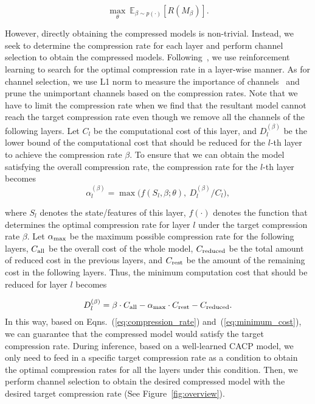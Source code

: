 \documentclass[letterpaper]{article} %
\begin{document}
\begin{equation}
    \max_{\theta} ~\mathbb{E}_{\beta \sim p(\cdot)} \left[  R \left(M_\beta \right) \right].
\end{equation}

However, directly obtaining the compressed models is non-trivial. Instead, we seek to determine the compression rate for each layer and perform channel selection to obtain the compressed models.
Following~\cite{he2018amc}, we use reinforcement learning to search for the optimal compression rate in a layer-wise manner. As for channel selection, we use L1 norm to measure the importance of channels~\cite{han2015learning} and prune the unimportant channels based on the compression rates. 
Note that we have to limit the compression rate when we find that the resultant model cannot reach the target compression rate even though we remove all the channels of the following layers.
Let $C_l$ be the computational cost of this layer, and $D_{l}^{(\beta)}$ be the lower bound of the computational cost that should be reduced for the $l$-th layer to achieve the compression rate $\beta$.
To ensure that we can obtain the model satisfying the overall compression rate, the compression rate for the $l$-th layer becomes
\begin{equation}\label{eq:compression_rate}
    \alpha_l^{(\beta)} = \max \Big( f(S_l, \beta; \theta), ~{D_{l}^{(\beta)}}{\big/}{C_l} \Big),
\end{equation}


where $S_l$ denotes the state/features of this layer, $f(\cdot)$ denotes the function that determines the optimal compression rate for layer $l$ under the target compression rate $\beta$. Let $\alpha_{\rm max}$ be the maximum possible compression rate for the following layers, $C_{\rm all}$ be the overall cost of the whole model, $C_{\rm reduced}$ be the total amount of reduced cost in the previous layers, and $C_{\rm rest}$ be the amount of the remaining cost in the following layers. Thus, the minimum computation cost that should be reduced for layer $l$ becomes

\begin{equation}\label{eq:minimum_cost}
    D_{l}^{(\beta)} = \beta \cdot C_{\rm all} - \alpha_{\rm max} \cdot C_{\rm rest} - C_{\rm reduced}.
\end{equation}
In this way, based on Eqns.~(\ref{eq:compression_rate}) and~(\ref{eq:minimum_cost}), we can guarantee that the compressed model would satisfy the target compression rate. 
During inference, based on a well-learned CACP model, we only need to feed in a specific target compression rate as a condition to obtain the optimal compression rates for all the layers under this condition. Then, we perform channel selection to obtain the desired compressed model with the desired target compression rate (See Figure~\ref{fig:overview}).
\end{document}
